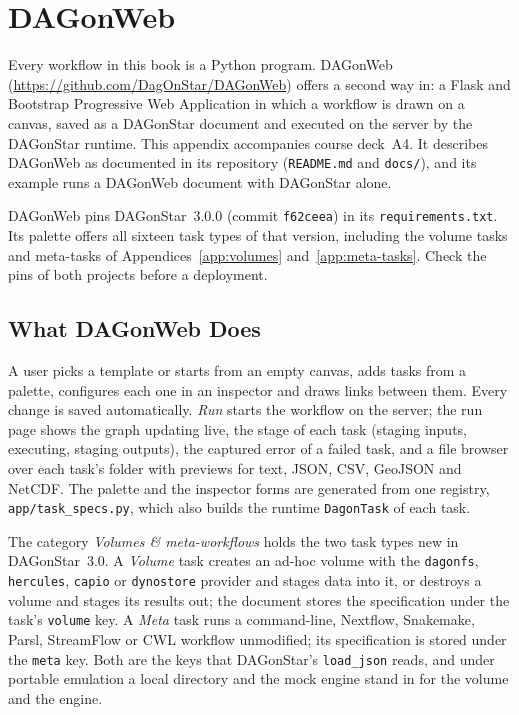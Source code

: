 \chapter{DAGonWeb}
\label{app:dagonweb}

Every workflow in this book is a Python program. DAGonWeb
(\url{https://github.com/DagOnStar/DAGonWeb}) offers a second way in: a Flask
and Bootstrap Progressive Web Application in which a workflow is drawn on a
canvas, saved as a DAGonStar document and executed on the server by the
DAGonStar runtime. This appendix accompanies course deck~A4. It describes
DAGonWeb as documented in its repository (\texttt{README.md} and
\texttt{docs/}), and its example runs a DAGonWeb document with DAGonStar alone.

\begin{cautionbox}[Versions]
DAGonWeb pins DAGonStar~3.0.0 (commit \texttt{f62ceea}) in its
\texttt{requirements.txt}. Its palette offers all sixteen task types of that
version, including the volume tasks and meta-tasks of
Appendices~\ref{app:volumes} and~\ref{app:meta-tasks}. Check the pins of both
projects before a deployment.
\end{cautionbox}

\section{What DAGonWeb Does}

A user picks a template or starts from an empty canvas, adds tasks from a
palette, configures each one in an inspector and draws links between them.
Every change is saved automatically. \emph{Run} starts the workflow on the
server; the run page shows the graph updating live, the stage of each task
(staging inputs, executing, staging outputs), the captured error of a failed
task, and a file browser over each task's folder with previews for text, JSON,
CSV, GeoJSON and NetCDF. The palette and the inspector forms are generated from
one registry, \texttt{app/task\_specs.py}, which also builds the runtime
\texttt{DagonTask} of each task.

The category \emph{Volumes \& meta-workflows} holds the two task types new in
DAGonStar~3.0. A \emph{Volume} task creates an ad-hoc volume with the
\texttt{dagonfs}, \texttt{hercules}, \texttt{capio} or \texttt{dynostore}
provider and stages data into it, or destroys a volume and stages its results
out; the document stores the specification under the task's \texttt{volume}
key. A \emph{Meta} task runs a command-line, Nextflow, Snakemake, Parsl,
StreamFlow or CWL workflow unmodified; its specification is stored under the
\texttt{meta} key. Both are the keys that DAGonStar's \texttt{load\_json} reads,
and under portable emulation a local directory and the mock engine stand in
for the volume and the engine.

